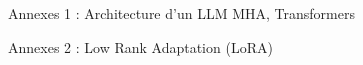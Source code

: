 \begin{frame}{Annexes 1 : Architecture d'un LLM}
    \label{ap:llm_architecture}
    MHA, Transformers
    
\end{frame}

\begin{frame}{Annexes 2 : Low Rank Adaptation (LoRA)}
    \label{ap:lora}
    
\end{frame}
